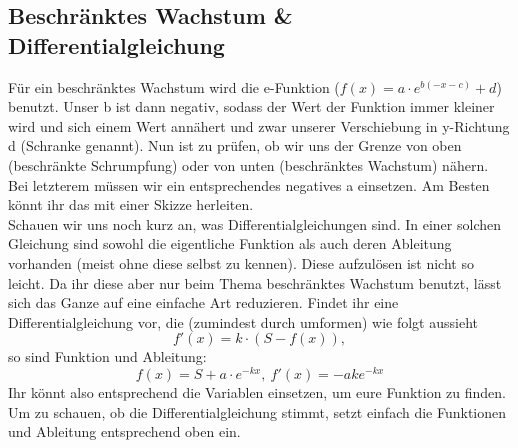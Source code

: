 	\subsection{Beschränktes Wachstum \& Differentialgleichung}
		Für ein beschränktes Wachstum wird die e-Funktion (\(f(x)=a\cdot
		e^{b(-x-c)}+d\)) benutzt. Unser b ist dann negativ, sodass der Wert der
		Funktion immer kleiner wird und sich einem Wert annähert und zwar unserer
		Verschiebung in y-Richtung d (Schranke genannt). Nun ist zu prüfen, ob wir uns
		der Grenze von oben (beschränkte Schrumpfung) oder von unten (beschränktes
		Wachstum) nähern. Bei letzterem müssen wir ein entsprechendes negatives a
		einsetzen. Am Besten könnt ihr das mit einer Skizze herleiten.\\
		Schauen wir uns noch kurz an, was Differentialgleichungen sind. In einer
		solchen Gleichung sind sowohl die eigentliche Funktion als auch deren
		Ableitung vorhanden (meist ohne diese selbst zu kennen). Diese aufzulösen ist
		nicht so leicht. Da ihr diese aber nur beim Thema beschränktes Wachstum
		benutzt, lässt sich das Ganze auf eine einfache Art reduzieren. Findet ihr
		eine Differentialgleichung vor, die (zumindest durch umformen) wie folgt
		aussieht
		\[f'(x)=k\cdot (S-f(x)),\]
		so sind Funktion und Ableitung:
		\[f(x)=S+a\cdot e^{-kx},\ f'(x)=-ake^{-kx}\]
		Ihr könnt also entsprechend die Variablen einsetzen, um eure Funktion zu
		finden. Um zu schauen, ob die Differentialgleichung stimmt, setzt einfach die
		Funktionen und Ableitung entsprechend oben ein.

